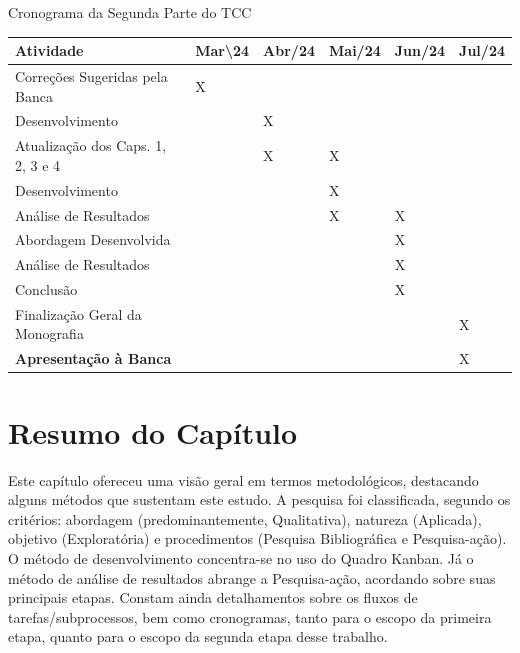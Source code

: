 \begin{quadro}
\caption{\label{Cronograma2}Cronograma da Segunda Parte do TCC}
\centering

\begin{tabular}{|p{7cm}|p{1.5cm}|p{1.5cm}|p{1.5cm}|p{1.5cm}|p{1.5cm}|}
\hline
\textbf{Atividade} & \textbf{Mar\textbackslash{}24} & \textbf{Abr/24} & \textbf{Mai/24} & \textbf{Jun/24} & \textbf{Jul/24} \\ \hline
{Correções Sugeridas pela Banca} & X &  &  &  &  \\ \hline
{Desenvolvimento} &  & X &  &  &  \\ \hline
{Atualização dos Caps. 1, 2, 3 e 4} &  & X & X &  &  \\ \hline
{Desenvolvimento} &  &  & X &  &  \\ \hline
{Análise de Resultados} &  &  & X & X &  \\ \hline
{Abordagem Desenvolvida} &  &  &  & X &  \\ \hline
{Análise de Resultados} &  &  &  & X &  \\ \hline
{Conclusão} &  &  &  & X &  \\ \hline
{Finalização Geral da Monografia} &  &  &  &  & X \\ \hline
\textbf{Apresentação à Banca} &  &  &  &  & X \\ \hline
\end{tabular}

\end{quadro} 


\section{Resumo do Capítulo}
    \label{ResumoCap}

Este capítulo ofereceu uma visão geral em termos metodológicos, destacando alguns métodos que sustentam este estudo. A pesquisa foi classificada, segundo os critérios: abordagem (predominantemente, Qualitativa), natureza (Aplicada), objetivo (Exploratória) e procedimentos (Pesquisa Bibliográfica e Pesquisa-ação). O método de desenvolvimento concentra-se no uso do Quadro Kanban. Já o método de  análise de resultados abrange a Pesquisa-ação, acordando sobre suas principais etapas. Constam ainda detalhamentos sobre os fluxos de tarefas/subprocessos, bem como cronogramas, tanto para o escopo da primeira etapa, quanto para o escopo da segunda etapa desse trabalho.

